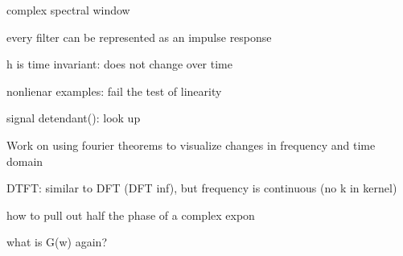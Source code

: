 
complex spectral window

every filter can be represented as an impulse response

h is time invariant: does not change over time

nonlienar examples: fail the test of linearity

signal detendant(): look up

Work on using fourier theorems to visualize changes in frequency and time domain

DTFT: similar to DFT (DFT inf), but frequency is continuous (no k in kernel)

how to pull out half the phase of a complex expon

what is G(w) again?


